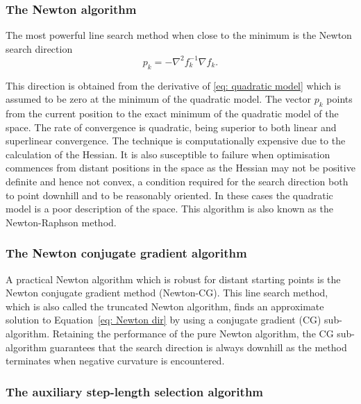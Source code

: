 \subsubsection{The Newton algorithm}

The most powerful line search method when close to the minimum is the Newton search direction
\begin{equation} \label{eq: Newton dir}
 p_k = - \nabla^2 f_k^{-1} \nabla f_k.
\end{equation}

\noindent This direction is obtained from the derivative of \eqref{eq: quadratic model} which is assumed to be zero at the minimum of the quadratic model.
The vector $p_k$ points from the current position to the exact minimum of the quadratic model of the space.
The rate of convergence is quadratic, being superior to both linear and superlinear convergence.
The technique is computationally expensive due to the calculation of the Hessian.
It is also susceptible to failure when optimisation commences from distant positions in the space as the Hessian may not be positive definite and hence not convex, a condition required for the search direction both to point downhill and to be reasonably oriented.
In these cases the quadratic model is a poor description of the space.
This algorithm is also known as the Newton-Raphson method.


\subsubsection{The Newton conjugate gradient algorithm}

A practical Newton algorithm which is robust for distant starting points is the Newton conjugate gradient method (Newton-CG).
This line search method, which is also called the truncated Newton algorithm, finds an approximate solution to Equation~\eqref{eq: Newton dir} by using a conjugate gradient (CG) sub-algorithm.
Retaining the performance of the pure Newton algorithm, the CG sub-algorithm guarantees that the search direction is always downhill as the method terminates when negative curvature is encountered.


\subsubsection{The auxiliary step-length selection algorithm}

